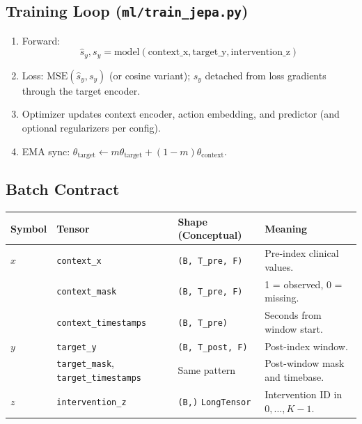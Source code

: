 \documentclass[11pt]{article}
\begin{document}
\subsection{Training Loop (\texttt{ml/train\_jepa.py})}
\begin{enumerate}[leftmargin=1.5em]
  \item Forward:
  \[
  \hat{s}_y, s_y = \mathrm{model}(\mathrm{context\_x}, \mathrm{target\_y}, \mathrm{intervention\_z})
  \]
  \item Loss: $\mathrm{MSE}(\hat{s}_y, s_y)$ (or cosine variant); $s_y$ detached from loss gradients through the target encoder.
  \item Optimizer updates context encoder, action embedding, and predictor (and optional regularizers per config).
  \item EMA sync: $\theta_{\text{target}} \leftarrow m\theta_{\text{target}} + (1-m)\theta_{\text{context}}$.
\end{enumerate}

\subsection{Batch Contract}

\begin{longtable}{p{} p{} p{} p{}}
\toprule
\textbf{Symbol} & \textbf{Tensor} & \textbf{Shape (Conceptual)} & \textbf{Meaning} \\
\midrule
$x$ & \texttt{context\_x} & \texttt{(B, T\_pre, F)} & Pre-index clinical values. \\
 & \texttt{context\_mask} & \texttt{(B, T\_pre, F)} & 1 = observed, 0 = missing. \\
 & \texttt{context\_timestamps} & \texttt{(B, T\_pre)} & Seconds from window start. \\
$y$ & \texttt{target\_y} & \texttt{(B, T\_post, F)} & Post-index window. \\
 & \texttt{target\_mask}, \texttt{target\_timestamps} & Same pattern & Post-window mask and timebase. \\
$z$ & \texttt{intervention\_z} & \texttt{(B,)} \texttt{LongTensor} & Intervention ID in $0,\dots,K-1$. \\
\bottomrule
\end{longtable}
\end{document}
